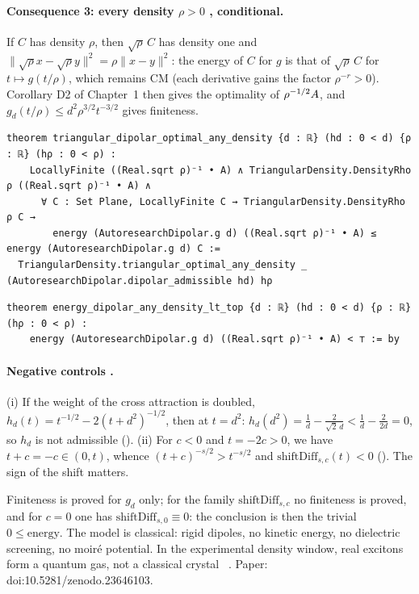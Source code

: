 \paragraph{Consequence 3: every density $\rho>0$ \tierA, conditional.} If $C$ has density $\rho$, then
$\sqrt\rho\,C$ has density one and $\|\sqrt\rho x-\sqrt\rho y\|^2=\rho\|x-y\|^2$: the energy of $C$ for $g$ is that of
$\sqrt\rho\,C$ for $t\mapsto g(t/\rho)$, which remains CM (each derivative gains the factor $\rho^{-r}>0$). Corollary D2
of Chapter~1 then gives the optimality of $\rho^{-1/2}A$, and $g_d(t/\rho)\le d^2\rho^{3/2}t^{-3/2}$ gives finiteness.
\begin{leanbox}
\begin{lstlisting}[style=chdeux]
theorem triangular_dipolar_optimal_any_density {d : ℝ} (hd : 0 < d) {ρ : ℝ} (hρ : 0 < ρ) :
    LocallyFinite ((Real.sqrt ρ)⁻¹ • A) ∧ TriangularDensity.DensityRho ρ ((Real.sqrt ρ)⁻¹ • A) ∧
      ∀ C : Set Plane, LocallyFinite C → TriangularDensity.DensityRho ρ C →
        energy (AutoresearchDipolar.g d) ((Real.sqrt ρ)⁻¹ • A) ≤ energy (AutoresearchDipolar.g d) C :=
  TriangularDensity.triangular_optimal_any_density _ (AutoresearchDipolar.dipolar_admissible hd) hρ
\end{lstlisting}
\begin{lstlisting}[style=chdeux]
theorem energy_dipolar_any_density_lt_top {d : ℝ} (hd : 0 < d) {ρ : ℝ} (hρ : 0 < ρ) :
    energy (AutoresearchDipolar.g d) ((Real.sqrt ρ)⁻¹ • A) < ⊤ := by
\end{lstlisting}
\end{leanbox}

\paragraph{Negative controls \tierA.} (i) If the weight of the cross attraction is doubled,
$h_d(t)=t^{-1/2}-2(t+d^2)^{-1/2}$, then at $t=d^2$:
$h_d(d^2)=\frac1d-\frac{2}{\sqrt2\,d}<\frac1d-\frac{2}{2d}=0$, so $h_d$ is not admissible ().
(ii) For $c<0$ and $t=-2c>0$, we have $t+c=-c\in(0,t)$, whence $(t+c)^{-s/2}>t^{-s/2}$ and
$\mathrm{shiftDiff}_{s,c}(t)<0$ (). The sign of the shift matters.

\begin{warnbox}[: scope]
Finiteness is proved for $g_d$ only; for the family $\mathrm{shiftDiff}_{s,c}$ no finiteness is proved, and for $c=0$
one has $\mathrm{shiftDiff}_{s,0}\equiv0$: the conclusion is then the trivial $0\le\mathrm{energy}$. The model is
classical: rigid dipoles, no kinetic energy, no dielectric screening, no moiré potential. In the experimental density
window, real excitons form a quantum gas, not a classical crystal \tierC~\cite{ch2dip}. Paper: doi\string:10.5281/zenodo.23646103.
\end{warnbox}

